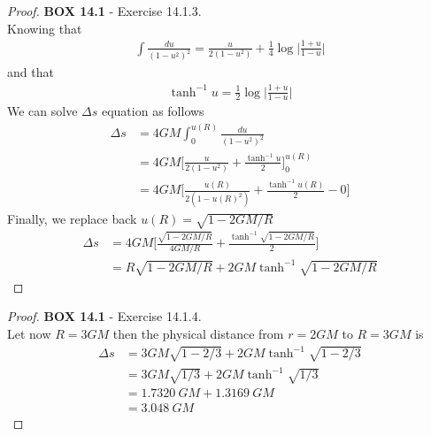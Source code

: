 \documentclass[11pt]{article}
\theoremstyle{definition}
\begin{document}
\begin{proof}{\textbf{BOX 14.1} - Exercise 14.1.3.}\\
Knowing that
\begin{align*}
    \int \frac{du}{(1 - u^2)^2} = \frac{u}{2(1 - u^2)}
    + \frac{1}{4}\log\bigg|\frac{1 + u}{1 - u}\bigg|
\end{align*}
and that
\begin{align*}
    \tanh^{-1} u = \frac{1}{2}\log\bigg|\frac{1 + u}{1 - u}\bigg|
\end{align*}
We can solve $\Delta s$ equation as follows
\begin{align*}
    \Delta s &= 4GM \int_0^{u(R)} \frac{du}{(1 - u^2)^2}\\
    &= 4GM \bigg[\frac{u}{2(1 - u^2)} + \frac{\tanh^{-1} u}{2}\bigg]_0^{u(R)}\\
    &= 4GM \bigg[\frac{u(R)}{2(1 - u(R)^2)} + \frac{\tanh^{-1} u(R)}{2} - 0\bigg]
\end{align*}
Finally, we replace back $u(R) = \sqrt{1 - 2GM/R}$
\begin{align*}
    \Delta s 
    &= 4GM \bigg[\frac{\sqrt{1 - 2GM/R}}{4GM/R}
    + \frac{\tanh^{-1} \sqrt{1 - 2GM/R}}{2}\bigg]\\
    &= R\sqrt{1 - 2GM/R} + 2GM\tanh^{-1} \sqrt{1 - 2GM/R}
\end{align*}
\end{proof}
\begin{proof}{\textbf{BOX 14.1} - Exercise 14.1.4.}\\
Let now $R = 3GM$ then the physical distance from $r=2GM$ to $R = 3GM$ is
\begin{align*}
    \Delta s 
    &= 3GM\sqrt{1 - 2/3} + 2GM\tanh^{-1} \sqrt{1 - 2/3}\\
    &= 3GM\sqrt{1/3} + 2GM\tanh^{-1} \sqrt{1/3}\\
    &= 1.7320~GM + 1.3169~GM\\
    &= 3.048~GM
\end{align*}

\end{proof}
\end{document}
